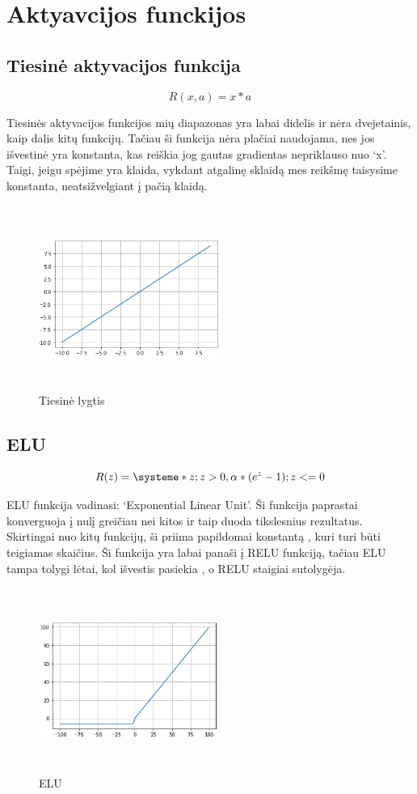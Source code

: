 \documentclass{VUMIFInfKursinis}
\begin{document}
\section{Aktyavcijos funckijos}
\subsection{Tiesinė aktyvacijos funkcija}
\[
R(x, a) = x * a
\]
\par
Tiesinės aktyvacijos funkcijos mių diapazonas yra labai didelis ir nėra dvejetainis,
kaip dalis kitų funkcijų. Tačiau ši funkcija nėra plačiai naudojama, nes jos
išvestinė yra konstanta, kas reiškia jog gautas gradientas nepriklauso nuo ‘x’.
Taigi, jeigu spėjime yra klaida, vykdant atgalinę sklaidą mes reikšmę taisysime
konstanta, neatsižvelgiant į pačią klaidą.

\begin{figure}[ht]
  \includegraphics[width=6cm,height=6cm,keepaspectratio]{tiesine.png}
  \caption{Tiesinė lygtis}
  \label{fig:lygtis1}
\end{figure}

\subsection{ELU}
\[
  R(z) = \systeme*{z; z > 0, \alpha*(e^z - 1); z <= 0}
\]
\par
ELU funkcija vadinasi: ‘Exponential Linear Unit’. Ši funkcija paprastai konverguoja į
nulį greičiau nei kitos ir taip duoda tikslesnius rezultatus. Skirtingai nuo kitų
funkcijų, ši priima papildomai konstantą , kuri turi būti teigiamas skaičius.
Ši funkcija yra labai panaši į RELU funkciją, tačiau ELU tampa tolygi lėtai,
kol išvestis pasiekia , o RELU staigiai sutolygėja.

\begin{figure}[ht]
  \includegraphics[width=6cm,height=6cm,keepaspectratio]{elu.png}
  \caption{ELU}
  \label{fig:elu}
\end{figure}
\end{document}
